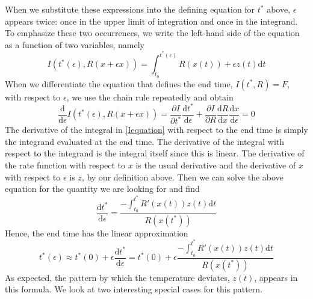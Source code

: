 \documentclass[12 pt]{article}
\begin{document}
When we substitute these expressions into the defining equation for $t^*$ above, $\epsilon$ appears twice: once in the upper limit of integration and once in the integrand. To emphasize these two occurrences, we write the left-hand side of the equation as a function of two variables, namely
\begin{equation} \label{Iequation}
    I(t^*(\epsilon),R(x+\epsilon x)) = \int _{t_0} ^{t^*(\epsilon)} R(x(t))+\epsilon z(t) \mathrm{d}t \tag{Eq. \theequation}
\end{equation}
When we differentiate the equation that defines the end time, $I(t^* ,R)=F$, with respect to $\epsilon$, we use the chain rule repeatedly and obtain
\begin{equation} 
    \frac{\mathrm{d}}{\mathrm{d}\epsilon}I(t^*(\epsilon),R(x+\epsilon x)) = \frac{\partial I}{\partial t^*} \frac{\mathrm{d}t^*}{\mathrm{d}\epsilon}+\frac{\partial I}{\partial R} \frac{\mathrm{d} R}{\mathrm{d} x} \frac{\mathrm{d}x}{\mathrm{d}\epsilon} = 0 \tag{Eq. \theequation}
\end{equation}
The derivative of the integral in \ref{Iequation} with respect to the end time is simply the integrand evaluated at the end time. The derivative of the integral with respect to the integrand is the integral itself since this is linear. The derivative of the rate function with respect to $x$ is the usual derivative and the derivative of $x$ with respect to $\epsilon$ is $z$, by our definition above. Then we can solve the above equation for the quantity we are looking for and find
\begin{equation} \label{dtdepsilon}
    \frac{\mathrm{d}t^*}{\mathrm{d}\epsilon}=\frac{- \int _{t_0} ^{t^*} R'(x(t)) z(t) \tag{Eq. \theequation} \mathrm{d}t}{R(x(t^*))}
\end{equation}
Hence, the end time has the linear approximation
\begin{equation}
    t^*(\epsilon) \approx t^*(0)+\epsilon \frac{\mathrm{d}t^*}{\mathrm{d}\epsilon}=t^*(0)+\epsilon \frac{- \int _{t_0} ^{t^*} R'(x(t)) z(t) \mathrm{d}t}{R(x(t^*))} \tag{Eq. \theequation}
\end{equation}
As expected, the pattern by which the temperature deviates, $z(t)$, appears in this formula. We look at two interesting special cases for this pattern. \par
\end{document}
